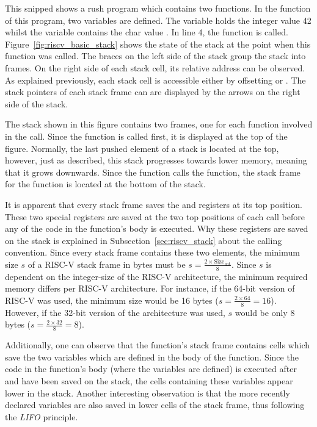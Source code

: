 
This snipped shows a rush program which contains two functions.
In the  function of this program, two variables are defined.
The  variable holds the integer value 42 whilst the  variable contains the char value .
In line 4, the  function is called.
Figure~\ref{fig:riscv_basic_stack} shows the state of the stack at the point when this function was called.
The braces on the left side of the stack group the stack into frames.
On the right side of each stack cell, its relative address can be observed.
As explained previously, each stack cell is accessible either by offsetting 
or . The stack pointers of each stack frame can are displayed by the arrows on the right side of the stack.

The stack shown in this figure contains two frames, one for each function involved in the call.
Since the  function is called first, it is displayed at the top of the figure.
Normally, the last pushed element of a stack is located at the top, however, just as described,
this stack progresses towards lower memory, meaning that it grows downwards.
Since the  function calls the  function, the stack frame for the  function is located at the bottom of the stack.

It is apparent that every stack frame saves the  and  registers at its top position.
These two special registers are saved at the two top positions of each call before any of the code in the function's body is executed.
Why these registers are saved on the stack is explained in Subsection~\ref{sec:riscv_stack} about the calling convention.
Since every stack frame contains these two elements,
the minimum size $s$ of a RISC-V stack frame in bytes must be $s = \frac{2 \times \text{Size}\,_\text{int}}{8}$.
Since $s$ is dependent on the integer-size of the RISC-V architecture, the minimum required memory differs per RISC-V architecture.
For instance, if the 64-bit version of RISC-V was used, the minimum size would be 16 bytes ($s = \frac{2 \times 64}{8} = 16$).
However, if the 32-bit version of the architecture was used, $s$ would be only 8 bytes ($s = \frac{2 \times 32}{8} = 8$).

Additionally, one can observe that the  function's
stack frame contains cells which save the two variables which are defined in the body of the function.
Since the code in the function's body (where the variables are defined) is executed after  and  have been saved on the stack,
the cells containing these variables appear lower in the stack.
Another interesting observation is that the more recently declared variables are also saved in lower cells of the stack frame, thus following the \emph{LIFO} principle.

